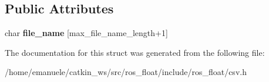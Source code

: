\subsection*{Public Attributes}
\begin{DoxyCompactItemize}
\item 
\mbox{\label{structio_1_1error_1_1with__file__name_ac957d5590a8b95517b74eb5bf373a424}} 
char {\bfseries file\+\_\+name} \mbox{[}max\+\_\+file\+\_\+name\+\_\+length+1\mbox{]}
\end{DoxyCompactItemize}


The documentation for this struct was generated from the following file\+:\begin{DoxyCompactItemize}
\item 
/home/emanuele/catkin\+\_\+ws/src/ros\+\_\+float/include/ros\+\_\+float/csv.\+h\end{DoxyCompactItemize}
